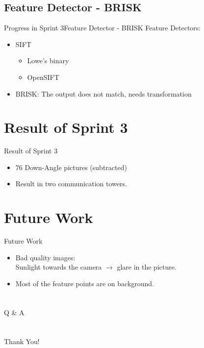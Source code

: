 \documentclass[slidestop,compress,mathserif,c]{beamer}
\begin{document}
    \subsection{Feature Detector - BRISK}
    \begin{frame}{Progress in Sprint 3}{Feature Detector - BRISK}
    Feature Detectors:
        \begin{itemize}
            \item SIFT
                \begin{itemize}
                    \item Lowe's binary
                    \item OpenSIFT
                \end{itemize}
            \item \alert{BRISK}: The output does not match, needs transformation
        \end{itemize}
    \end{frame}
    
    \section{Result of Sprint 3}
    \begin{frame}{Result of Sprint 3}
        \begin{itemize}
            \item 76 Down-Angle pictures (subtracted)
            \item Result in two communication towers.
        \end{itemize}
    \end{frame}
    
    \section{Future Work}
    \begin{frame}{Future Work}
        \begin{itemize}
            \item Bad quality images:\\
            Sunlight towards the camera $\rightarrow$ glare in the picture.
            \item Most of the feature points are on background.
        \end{itemize}
    \end{frame}
    
    \section*{}
		\begin{frame}
			\begin{center}
				\Huge{Q \& A}
			\end{center}
		\end{frame}
    
    \section*{}
		\begin{frame}
			\begin{center}
				\Huge{Thank You!}
			\end{center}
		\end{frame}
\end{document}
